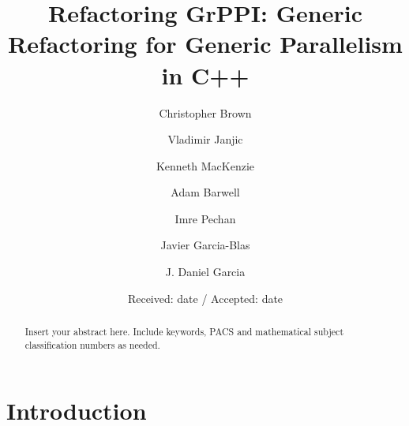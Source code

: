 \title{Refactoring GrPPI: Generic Refactoring for Generic Parallelism in C++}%



\author{Christopher Brown         \and
        Vladimir Janjic \and 
        Kenneth MacKenzie \and
        Adam Barwell \and
        Imre Pechan \and
        Javier Garcia-Blas \and
        J. Daniel Garcia
}



\date{Received: date / Accepted: date}


\maketitle

\begin{abstract}
Insert your abstract here. Include keywords, PACS and mathematical
subject classification numbers as needed.
\end{abstract}

\section{Introduction}
\label{intro}


